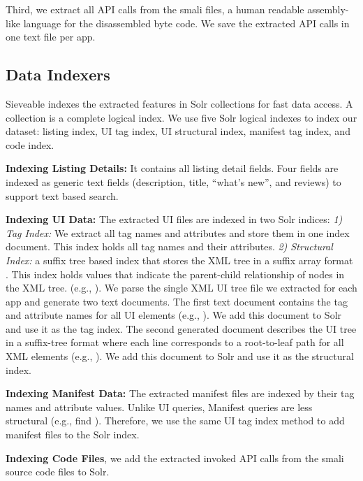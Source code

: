 Third, we extract all API calls from the smali files, a human readable assembly-like language for the disassembled byte code.
We save the extracted API calls in one text file per app.

\subsection{Data Indexers}
Sieveable indexes the extracted features in Solr collections for fast data access.
A collection is a complete logical index.
We use five Solr logical indexes to index our dataset: listing index, UI tag index, UI structural index, manifest tag index, and code index.

\textbf{Indexing Listing Details:} It contains all listing detail fields. Four fields are indexed as generic text fields (description, title, ``what's new'', and reviews) to support text based search.

\textbf{Indexing UI Data:} The extracted UI files are indexed in two Solr indices: \textit{1) Tag Index:} We extract all tag names and attributes and store them in one index document.
This index holds all tag names and their attributes.
\textit{2) Structural Index:} a suffix tree based index that stores the XML tree in a suffix array format \cite{shasha_2002_atreegrep}.
This index holds values that indicate the parent-child relationship of nodes in the XML tree. (e.g., ).
We parse the single XML UI tree file we extracted for each app and generate two text documents. The first text document contains the tag and attribute names for all UI elements (e.g., ).
We add this document to Solr and use it as the tag index.
The second generated document describes the UI tree in a suffix-tree format where each line corresponds to a root-to-leaf path for all XML elements (e.g., ).
We add this document to Solr and use it as the structural index.

\textbf{Indexing Manifest Data:} The extracted manifest files are indexed by their tag names and attribute values.
Unlike UI queries, Manifest queries are less structural (e.g., find ).
Therefore, we use the same UI tag index method to add manifest files to the Solr index.

\textbf{Indexing Code Files}, we add the extracted invoked API calls from the smali source code files to Solr.

